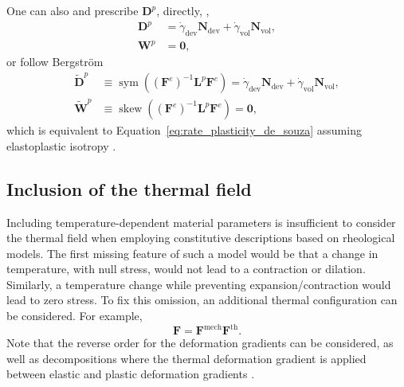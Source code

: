 One can also and prescribe $\bm D^p$, directly, \citep{boyceLargeInelasticDeformation1988},
\begin{align}
\label{eq:d_w_directly}
	\bm D^p & = \dot\gamma_\text{dev} \bm N_\text{dev} + \dot\gamma_\text{vol} \bm N_\text{vol},\\
	\bm W^p & = \bm 0,
\end{align}
or follow Bergström \citep{bergstromMechanicsSolidPolymers2015}
\begin{align}
	\label{eq:d_w_bergstrom}
	\tilde{\bm D}^p &\equiv \operatorname{sym}((\bm F^e)^{-1}\bm L^p \bm F^e) = \dot\gamma_\text{dev} \bm N_\text{dev} + \dot\gamma_\text{vol} \bm N_\text{vol},\\
	\tilde{\bm W}^p &\equiv \operatorname{skew}( (\bm F^e)^{-1}\bm L^p \bm F^e) = \bm 0,
\end{align}
which is equivalent to Equation~\eqref{eq:rate_plasticity_de_souza} assuming elastoplastic isotropy \citep{desouzanetoComputationalMethodsPlasticity2008}.

\subsection{Inclusion of the thermal field}
\label{sec:inclusion_thermal_field}

Including temperature-dependent material parameters is insufficient to consider the thermal field when employing constitutive descriptions based on rheological models.
The first missing feature of such a model would be that a change in temperature, with null stress, would not lead to a contraction or dilation.
Similarly, a temperature change while preventing expansion/contraction would lead to zero stress.
To fix this omission, an additional thermal configuration can be considered.
For example,
\begin{equation}
	\bm F = \bm F^\text{mech}\bm F^\text{th}.
\end{equation}
Note that the reverse order for the deformation gradients can be considered, as well as decompositions where the thermal deformation gradient is applied between elastic and plastic deformation gradients \citep{arrudaEffectsStrainRate1995}.

